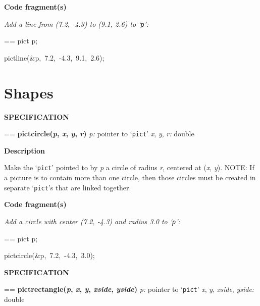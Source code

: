 \documentclass{book}
\makeatletter
\newcommand\Texinfocommandstyletextvar[1]{{\normalfont{}\textsl{#1}}}%
\newenvironment{Texinfopreformatted}{%
  \par\GNUTobeylines\obeyspaces\frenchspacing\parskip=\z@\parindent=\z@}{}
{\catcode`\^^M=13 \gdef\GNUTobeylines{\catcode`\^^M=13 \def^^M{\null\par}}}
\newenvironment{Texinfoindented}{\begin{list}{}{}\item\relax}{\end{list}}
\renewcommand{\_}{\Texinfounderscore\discretionary{}{}{}}
\makeatother
\begin{document}
\noindent{}\textbf{Code fragment(s)}

\emph{Add a line from (7.2, -4.3) to (9.1, 2.6) to `\texttt{p}':}
\begin{Texinfoindented}
\begin{Texinfopreformatted}%
\ttfamily pict p;

pict\_line(\&p,\ 7.2,\ -4.3,\ 9.1,\ 2.6);
\end{Texinfopreformatted}
\end{Texinfoindented}

\section{{Shapes}}
\label{anchor:Shapes}%

\noindent{}\textbf{SPECIFICATION}
\begin{Texinfoindented}
\begin{Texinfopreformatted}%
\textbf{pict\_circle(\Texinfocommandstyletextvar{p}, \Texinfocommandstyletextvar{x}, \Texinfocommandstyletextvar{y}, \Texinfocommandstyletextvar{r})}
\Texinfocommandstyletextvar{p:} pointer to `\texttt{pict}'
\Texinfocommandstyletextvar{x}, \Texinfocommandstyletextvar{y}, \Texinfocommandstyletextvar{r:} double
\end{Texinfopreformatted}
\end{Texinfoindented}
%

\noindent{}\textbf{Description}

Make the `\texttt{pict}' pointed to by \Texinfocommandstyletextvar{p} a circle of radius
\Texinfocommandstyletextvar{r}, centered at (\Texinfocommandstyletextvar{x}, \Texinfocommandstyletextvar{y}).
NOTE: If a picture is to contain more than one circle,
then those circles must
be created in separate `\texttt{pict}'s that are linked together.

\noindent{}\textbf{Code fragment(s)}

\emph{Add a circle with center (7.2, -4.3) and radius 3.0 to `\texttt{p}':}
\begin{Texinfoindented}
\begin{Texinfopreformatted}%
\ttfamily pict p;

pict\_circle(\&p,\ 7.2,\ -4.3,\ 3.0);
\end{Texinfopreformatted}
\end{Texinfoindented}

\noindent{}\textbf{SPECIFICATION}
\begin{Texinfoindented}
\begin{Texinfopreformatted}%
\textbf{pict\_rectangle(\Texinfocommandstyletextvar{p}, \Texinfocommandstyletextvar{x}, \Texinfocommandstyletextvar{y}, \Texinfocommandstyletextvar{xside}, \Texinfocommandstyletextvar{yside})}
\Texinfocommandstyletextvar{p:} pointer to `\texttt{pict}'
\Texinfocommandstyletextvar{x}, \Texinfocommandstyletextvar{y}, \Texinfocommandstyletextvar{xside}, \Texinfocommandstyletextvar{yside:} double
\end{Texinfopreformatted}
\end{Texinfoindented}
%
%
\end{document}

